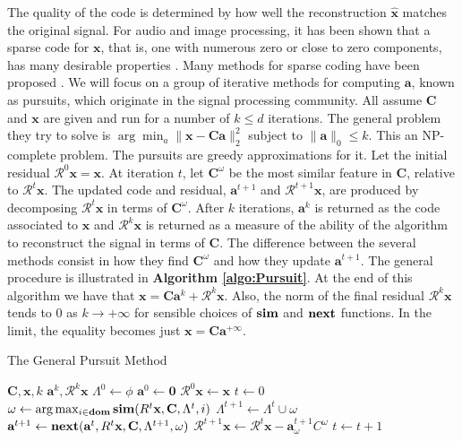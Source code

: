 \documentclass[runningheads,a4paper]{llncs}
\begin{document}
The quality of the code is determined by how well the reconstruction $\hat{\textbf{x}}$ matches the original signal. For audio and image processing, it has been shown that a sparse code for $\textbf{x}$, that is, one with numerous zero or close to zero components, has many desirable properties \cite{emergence-sparse-coding,sparse-coding-strategy-V1}. Many methods for sparse coding have been proposed \cite{undetermined-minimal-L1,sparse-coding-strategy-V1}. We will focus on a group of iterative methods for computing $\textbf{a}$, known as pursuits, which originate in the signal processing community. All assume $\textbf{C}$ and $\textbf{x}$ are given and run for a number of $k \leq d$ iterations. The general problem they try to solve is $\arg\min_a \|\textbf{x} - \textbf{C}\textbf{a}\|_2^2$ subject to $\|\textbf{a}\|_0 \leq k$. This an NP-complete problem. The pursuits are greedy approximations for it. Let the initial residual $\mathcal{R}^0\textbf{x} = \textbf{x}$. At iteration $t$, let $\textbf{C}^\omega$ be the most similar feature in $\textbf{C}$, relative to $\mathcal{R}^t\textbf{x}$. The updated code and residual, $\textbf{a}^{t+1}$ and $\mathcal{R}^{t+1}\textbf{x}$, are produced by decomposing $\mathcal{R}^t\textbf{x}$ in terms of $\textbf{C}^\omega$. After $k$ iterations, $\textbf{a}^k$ is returned as the code associated to $\textbf{x}$ and $\mathcal{R}^k\textbf{x}$ is returned as a measure of the ability of the algorithm to reconstruct the signal in terms of $\textbf{C}$. The difference between the several methods consist in how they find $\textbf{C}^\omega$ and how they update $\textbf{a}^{t+1}$. The general procedure is illustrated in \textbf{Algorithm \ref{algo:Pursuit}}. At the end of this algorithm we have that $\textbf{x} = \textbf{C}\textbf{a}^k + \mathcal{R}^k\textbf{x}$. Also, the norm of the final residual $\mathcal{R}^k\textbf{x}$ tends to $0$ as $k \rightarrow +\infty$ for sensible choices of $\text{\textbf{sim}}$ and $\text{\textbf{next}}$ functions. In the limit, the equality becomes just $\textbf{x} = \textbf{C}\textbf{a}^{+\infty}$. 

\begin{algorithm}
\caption{The General Pursuit Method}
\label{algo:Pursuit}
\begin{algorithmic}
\Require $\textbf{C},\textbf{x},k$
\Ensure $\textbf{a}^k,\mathcal{R}^k\textbf{x}$
\State $\Lambda^0 \gets \phi$
\State $\textbf{a}^0 \gets \textbf{0}$
\State $\mathcal{R}^0\textbf{x} \gets \textbf{x}$
\State $t \gets 0$
\State $\omega \gets \arg \max_{i \in \textbf{dom}} \text{\textbf{sim}}(R^t\textbf{x},\textbf{C},\Lambda^t,i)$
\State $\Lambda^{t+1} \gets \Lambda^t \cup \omega$
\State $\textbf{a}^{t+1} \gets \text{\textbf{next}}(\textbf{a}^t,R^t\textbf{x},\textbf{C},\Lambda^{t+1},\omega)$
\State $\mathcal{R}^{t+1}\textbf{x} \gets \mathcal{R}^t\textbf{x} - \textbf{a}^{t+1}_\omega C^\omega$
\State $t \gets t + 1$
\EndWhile
\end{algorithmic}
\end{algorithm}
\end{document}
